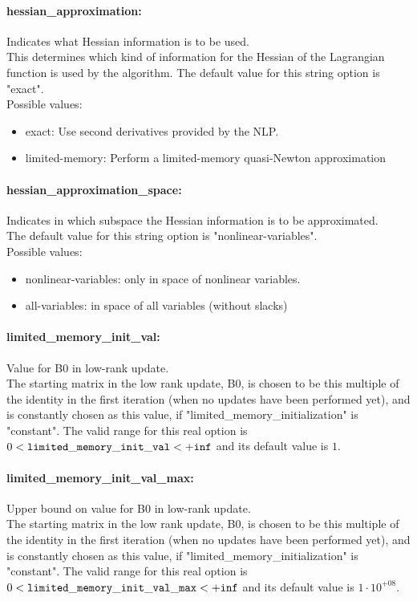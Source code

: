 \paragraph{hessian\_approximation:}\label{sec:hessian_approximation} Indicates what Hessian information is to be used. $\;$ \\
 This determines which kind of information for the
Hessian of the Lagrangian function is used by the
algorithm.
The default value for this string option is "exact".
\\ 
Possible values:
\begin{itemize}
   \item exact: Use second derivatives provided by the NLP.
   \item limited-memory: Perform a limited-memory quasi-Newton
approximation
\end{itemize}

\paragraph{hessian\_approximation\_space:}\label{sec:hessian_approximation_space} Indicates in which subspace the Hessian information is to be approximated. $\;$ \\
The default value for this string option is "nonlinear-variables".
\\ 
Possible values:
\begin{itemize}
   \item nonlinear-variables: only in space of nonlinear variables.
   \item all-variables: in space of all variables (without slacks)
\end{itemize}

\paragraph{limited\_memory\_init\_val:}\label{sec:limited_memory_init_val} Value for B0 in low-rank update. $\;$ \\
 The starting matrix in the low rank update, B0,
is chosen to be this multiple of the identity in
the first iteration (when no updates have been
performed yet), and is constantly chosen as this
value, if "limited\_memory\_initializat\-ion" is
"constant". The valid range for this real option is 
$0 <  {\tt limited\_memory\_init\_val } <  {\tt +inf}$
and its default value is $1$.


\paragraph{limited\_memory\_init\_val\_max:}\label{sec:limited_memory_init_val_max} Upper bound on value for B0 in low-rank update. $\;$ \\
 The starting matrix in the low rank update, B0,
is chosen to be this multiple of the identity in
the first iteration (when no updates have been
performed yet), and is constantly chosen as this
value, if "limited\_memory\_initializat\-ion" is
"constant". The valid range for this real option is 
$0 <  {\tt limited\_memory\_init\_val\_max } <  {\tt +inf}$
and its default value is $1 \cdot 10^{+08}$.



